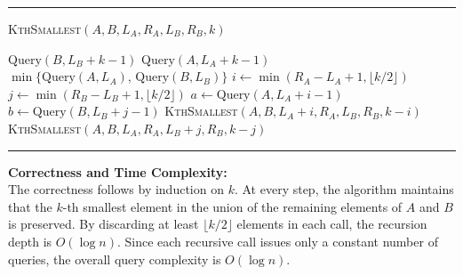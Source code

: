\documentclass[11pt]{article}
\begin{document}
    \par\noindent\rule{\textwidth}{0.4pt}
    \smallskip        
    \textsc{KthSmallest}$(A, B, L_A, R_A, L_B, R_B, k)$
    \begin{algorithmic}[1]
            \RETURN \(\text{Query}(B, L_B + k - 1)\)
        \ENDIF
            \RETURN \(\text{Query}(A, L_A + k - 1)\)
        \ENDIF
            \RETURN \(\min\{\text{Query}(A, L_A),\, \text{Query}(B, L_B)\}\)
        \ENDIF
        \STATE \( i \gets \min(R_A - L_A + 1, \lfloor k/2 \rfloor) \)
        \STATE \( j \gets \min(R_B - L_B + 1, \lfloor k/2 \rfloor) \)
        \STATE \( a \gets \text{Query}(A, L_A + i - 1) \)
        \STATE \( b \gets \text{Query}(B, L_B + j - 1) \)
             \RETURN \textsc{KthSmallest}\((A, B, L_A + i, R_A, L_B, R_B, k - i)\)
        \ELSE
             \RETURN \textsc{KthSmallest}\((A, B, L_A, R_A, L_B + j, R_B, k - j)\)
        \ENDIF
    \end{algorithmic}
    \vspace{-2mm}
    \par\noindent\rule{\textwidth}{0.4pt}
    
    \bigskip
    
    \textbf{Correctness and Time Complexity:} \\
    The correctness follows by induction on \( k \). At every step, the algorithm maintains that the \( k \)-th smallest element in the union of the remaining elements of \( A \) and \( B \) is preserved. By discarding at least \(\lfloor k/2 \rfloor\) elements in each call, the recursion depth is \( O(\log n) \). Since each recursive call issues only a constant number of queries, the overall query complexity is \( O(\log n) \).
    
        
    \newpage
\end{document}
